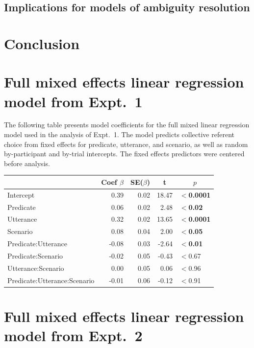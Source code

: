 \documentclass[linguex]{sp}
\begin{document}
\subsection{Implications for models of ambiguity resolution}


\section{Conclusion}


\appendix
\section{Full mixed effects linear regression model from Expt.~1}\label{expt1results}


The following table presents model coefficients for the full mixed linear regression model used in the analysis of Expt.~1. The model predicts collective referent choice from fixed effects for predicate, utterance, and scenario, as well as random by-participant and by-trial intercepts. The fixed effects predictors were centered before analysis.

\begin{center}

\begin{tabular}{lrrrl}\toprule
	&	Coef $\beta$	&	SE($\beta$)	&	\multicolumn{1}{c}{ \textbf{t}}	&	\multicolumn{1}{c}{$p$}\\ \midrule
Intercept	&	0.39	&	0.02	&	18.47	&	\textbf{$<$0.0001}\\
Predicate	&	0.06	&	0.02	&	2.48	&	\textbf{$<$0.02}\\
Utterance	&	0.32	&	0.02	&	13.65	&	\textbf{$<$0.0001}\\
Scenario	&	0.08	&	0.04	&	2.00	&	\textbf{$<$0.05}\\
Predicate:Utterance	&	-0.08	&	0.03	&	-2.64	&	\textbf{$<$0.01}\\
Predicate:Scenario	&	-0.02	&	0.05	&	-0.43	&	$<$0.67\\
Utterance:Scenario	&	0.00	&	0.05	&	0.06	&	$<$0.96\\
Predicate:Utterance:Scenario	&	-0.01	&	0.06	&	-0.12	&	$<$0.91\\
\bottomrule
\end{tabular}

\end{center}
 


\section{Full mixed effects linear regression model from Expt.~2}\label{expt2results}
\end{document}
